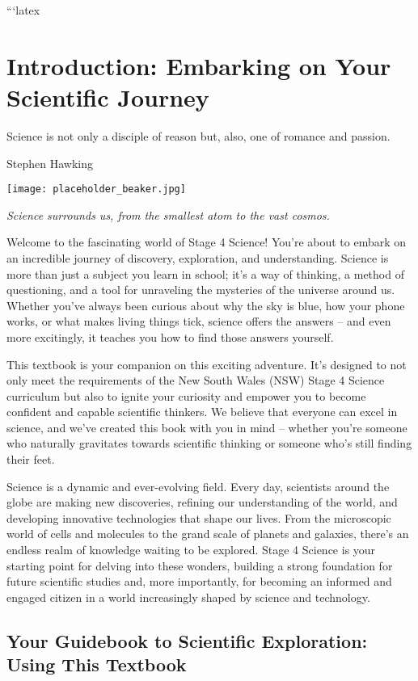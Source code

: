 ```latex
\chapter{Introduction: Embarking on Your Scientific Journey}

\epigraph{Science is not only a disciple of reason but, also, one of romance and passion.}{Stephen Hawking}

\begin{marginfigure}[0pt]
\texttt{[image: placeholder\_beaker.jpg]}
\caption*{\textit{Science surrounds us, from the smallest atom to the vast cosmos.}}
\end{marginfigure}
\FloatBarrier

Welcome to the fascinating world of Stage 4 Science!  You're about to embark on an incredible journey of discovery, exploration, and understanding. Science is more than just a subject you learn in school; it’s a way of thinking, a method of questioning, and a tool for unraveling the mysteries of the universe around us.  Whether you've always been curious about why the sky is blue, how your phone works, or what makes living things tick, science offers the answers – and even more excitingly, it teaches you how to find those answers yourself.

This textbook is your companion on this exciting adventure. It's designed to not only meet the requirements of the New South Wales (NSW) Stage 4 Science curriculum but also to ignite your curiosity and empower you to become confident and capable scientific thinkers. We believe that everyone can excel in science, and we’ve created this book with you in mind – whether you’re someone who naturally gravitates towards scientific thinking or someone who’s still finding their feet.

Science is a dynamic and ever-evolving field.  Every day, scientists around the globe are making new discoveries, refining our understanding of the world, and developing innovative technologies that shape our lives.  From the microscopic world of cells and molecules to the grand scale of planets and galaxies, there's an endless realm of knowledge waiting to be explored.  Stage 4 Science is your starting point for delving into these wonders, building a strong foundation for future scientific studies and, more importantly, for becoming an informed and engaged citizen in a world increasingly shaped by science and technology.

\section{Your Guidebook to Scientific Exploration: Using This Textbook}

